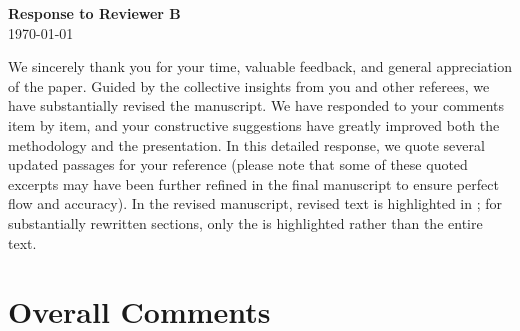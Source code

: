 \documentclass[11pt]{article}
\begin{document}
\begin{center}
    {\LARGE \textbf{Response to Reviewer B}} \\[1em]
    {\large \today}
\end{center}
\vspace{2em} %
\normalsize

We sincerely thank you for your time, valuable feedback, and general appreciation of the paper. Guided by the collective insights from you and other referees, we have substantially revised the manuscript. We have responded to your comments item by item, and your constructive suggestions have greatly improved both the methodology and the presentation. In this detailed response, we quote several updated passages for your reference (please note that some of these quoted excerpts may have been further refined in the final manuscript to ensure perfect flow and accuracy). In the revised manuscript, revised text is highlighted in ; for substantially rewritten sections, only the  is highlighted rather than the entire text. 

\section*{Overall Comments}
\end{document}
